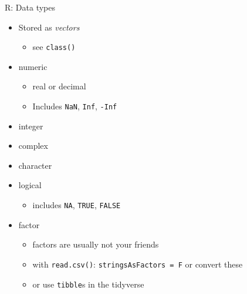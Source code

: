 \documentclass[ignorenonframetext,]{beamer}
\providecommand{\tightlist}{%
  \setlength{\itemsep}{0pt}\setlength{\parskip}{0pt}}
\begin{document}
\begin{frame}[fragile]{R: Data types}
\protect\hypertarget{r-data-types}{}

\begin{itemize}
\tightlist
\item
  Stored as \emph{vectors}

  \begin{itemize}
  \tightlist
  \item
    see \texttt{class()}
  \end{itemize}
\item
  numeric

  \begin{itemize}
  \tightlist
  \item
    real or decimal
  \item
    Includes \texttt{NaN}, \texttt{Inf}, \texttt{-Inf}
  \end{itemize}
\item
  integer
\item
  complex
\item
  character
\item
  logical

  \begin{itemize}
  \tightlist
  \item
    includes \texttt{NA}, \texttt{TRUE}, \texttt{FALSE}
  \end{itemize}
\item
  factor

  \begin{itemize}
  \tightlist
  \item
    factors are usually not your friends
  \item
    with \texttt{read.csv()}: \texttt{stringsAsFactors\ =\ F} or convert
    these
  \item
    or use \texttt{tibble}s in the tidyverse
  \end{itemize}
\end{itemize}

\end{frame}
\end{document}

